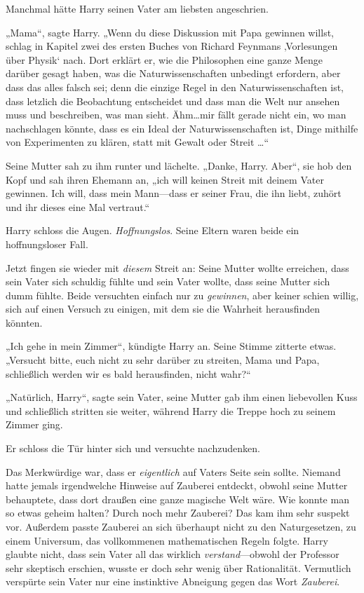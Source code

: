 {Manchmal hätte Harry seinen Vater am liebsten angeschrien.

„Mama“, sagte Harry. „Wenn du diese Diskussion mit Papa gewinnen willst, schlag in Kapitel zwei des ersten Buches von Richard Feynmans ‚Vorlesungen über Physik` nach. Dort erklärt er, wie die Philosophen eine ganze Menge darüber gesagt haben, was die Naturwissenschaften unbedingt erfordern, aber dass das alles falsch sei; denn die einzige Regel in den Naturwissenschaften ist, dass letzlich die Beobachtung entscheidet und dass man die Welt nur ansehen muss und beschreiben, was man sieht. Ähm…mir fällt gerade nicht ein, wo man nachschlagen könnte, dass es ein Ideal der Naturwissenschaften ist, Dinge mithilfe von Experimenten zu klären, statt mit Gewalt oder Streit …“

Seine Mutter sah zu ihm runter und lächelte. „Danke, Harry. Aber“, sie hob den Kopf und sah ihren Ehemann an, „ich will keinen Streit mit deinem Vater gewinnen. Ich will, dass mein Mann—dass er seiner Frau, die ihn liebt, zuhört und ihr dieses eine Mal vertraut.“

Harry schloss die Augen. \emph{Hoffnungslos}. Seine Eltern waren beide ein hoffnungsloser Fall.

Jetzt fingen sie wieder mit \emph{diesem} Streit an: Seine Mutter wollte erreichen, dass sein Vater sich schuldig fühlte und sein Vater wollte, dass seine Mutter sich dumm fühlte. Beide versuchten einfach nur zu \emph{gewinnen}, aber keiner schien willig, sich auf einen Versuch zu einigen, mit dem sie die Wahrheit herausfinden könnten.

„Ich gehe in mein Zimmer“, kündigte Harry an. Seine Stimme zitterte etwas. „Versucht bitte, euch nicht zu sehr darüber zu streiten, Mama und Papa, schließlich werden wir es bald herausfinden, nicht wahr?“

„Natürlich, Harry“, sagte sein Vater, seine Mutter gab ihm einen liebevollen Kuss und schließlich stritten sie weiter, während Harry die Treppe hoch zu seinem Zimmer ging.

Er schloss die Tür hinter sich und versuchte nachzudenken.

Das Merkwürdige war, dass er \emph{eigentlich} auf Vaters Seite sein sollte. Niemand hatte jemals irgendwelche Hinweise auf Zauberei entdeckt, obwohl seine Mutter behauptete, dass dort draußen eine ganze magische Welt wäre. Wie konnte man so etwas geheim halten? Durch noch mehr Zauberei? Das kam ihm sehr suspekt vor. Außerdem passte Zauberei an sich überhaupt nicht zu den Naturgesetzen, zu einem Universum, das vollkommenen mathematischen Regeln folgte. Harry glaubte nicht, dass sein Vater all das wirklich \emph{verstand}—obwohl der Professor sehr skeptisch erschien, wusste er doch sehr wenig über Rationalität. Vermutlich verspürte sein Vater nur eine instinktive Abneigung gegen das Wort \emph{Zauberei}.

}
